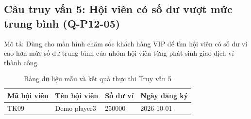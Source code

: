 \subsection{Câu truy vấn 5: Hội viên có số dư vượt mức trung bình (Q-P12-05)}
Mô tả: Dùng cho màn hình chăm sóc khách hàng VIP để tìm hội viên có số dư ví cao hơn mức số dư trung bình của nhóm hội viên từng phát sinh giao dịch ví thành công.
\begin{table}[H]
\centering\small
\caption{Bảng dữ liệu mẫu và kết quả thực thi Truy vấn 5}
\begin{tabularx}{\linewidth}{@{}XXXX@{}}\toprule
\textbf{Mã hội viên} & \textbf{Tên hội viên} & \textbf{Số dư ví} & \textbf{Ngày đăng ký}\\\midrule
TK09 & Demo player3 & 250000 & 2026-10-01\\
\bottomrule\end{tabularx}\end{table}
